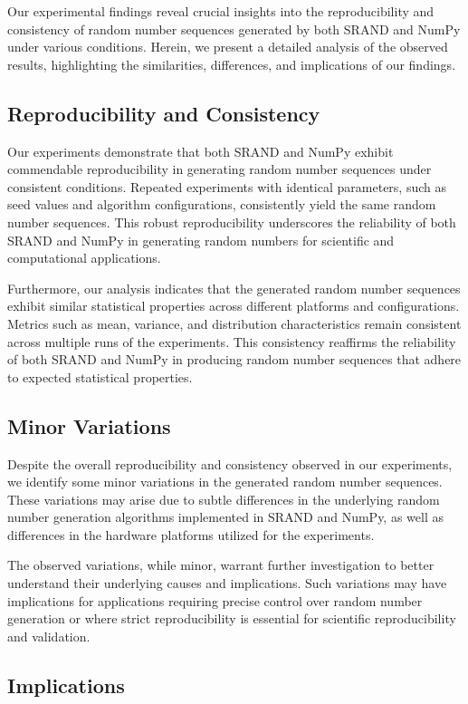 \documentclass{article}
\begin{document}
Our experimental findings reveal crucial insights into the reproducibility and consistency of random number sequences generated by both SRAND and NumPy under various conditions. Herein, we present a detailed analysis of the observed results, highlighting the similarities, differences, and implications of our findings.
\subsection{Reproducibility and Consistency}

Our experiments demonstrate that both SRAND and NumPy exhibit commendable reproducibility in generating random number sequences under consistent conditions. Repeated experiments with identical parameters, such as seed values and algorithm configurations, consistently yield the same random number sequences. This robust reproducibility underscores the reliability of both SRAND and NumPy in generating random numbers for scientific and computational applications.

Furthermore, our analysis indicates that the generated random number sequences exhibit similar statistical properties across different platforms and configurations. Metrics such as mean, variance, and distribution characteristics remain consistent across multiple runs of the experiments. This consistency reaffirms the reliability of both SRAND and NumPy in producing random number sequences that adhere to expected statistical properties.

\subsection{Minor Variations}

Despite the overall reproducibility and consistency observed in our experiments, we identify some minor variations in the generated random number sequences. These variations may arise due to subtle differences in the underlying random number generation algorithms implemented in SRAND and NumPy, as well as differences in the hardware platforms utilized for the experiments.

The observed variations, while minor, warrant further investigation to better understand their underlying causes and implications. Such variations may have implications for applications requiring precise control over random number generation or where strict reproducibility is essential for scientific reproducibility and validation.

\subsection{Implications}
\end{document}
